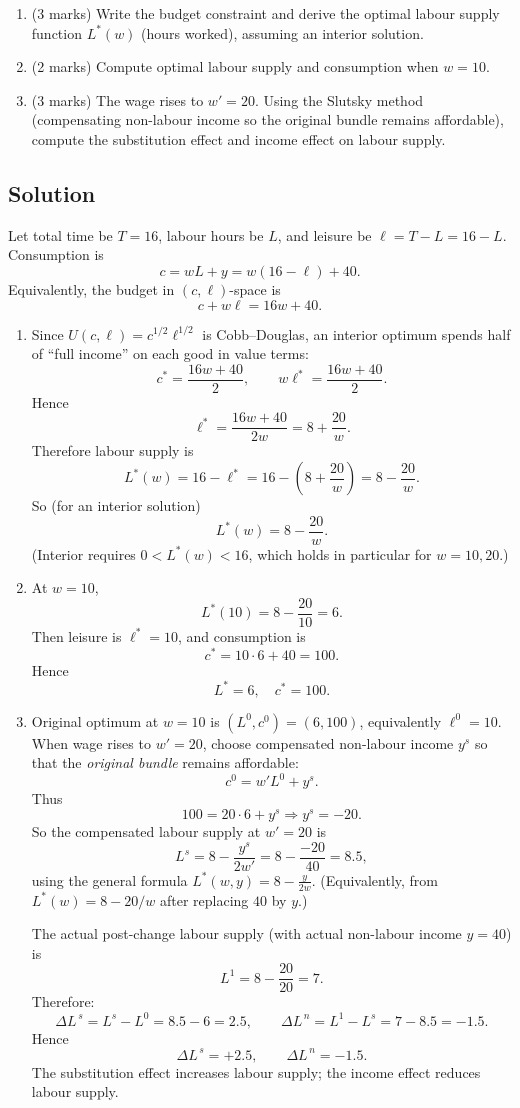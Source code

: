 \documentclass[12pt]{article}
\begin{document}
\begin{enumerate}[label=(\alph*)]
\item (3 marks) Write the budget constraint and derive the optimal labour supply function $L^*(w)$ (hours worked), assuming an interior solution.
\item (2 marks) Compute optimal labour supply and consumption when $w=10$.
\item (3 marks) The wage rises to $w'=20$. Using the Slutsky method (compensating non-labour income so the original bundle remains affordable), compute the substitution effect and income effect on labour supply.
\end{enumerate}

\subsection*{Solution}

Let total time be $T=16$, labour hours be $L$, and leisure be $\ell=T-L=16-L$.
Consumption is
\[
c=wL+y=w(16-\ell)+40.
\]
Equivalently, the budget in $(c,\ell)$-space is
\[
c+w\ell = 16w+40.
\]

\begin{enumerate}[label=(\alph*)]
\item Since $U(c,\ell)=c^{1/2}\ell^{1/2}$ is Cobb--Douglas, an interior optimum spends half of ``full income'' on each good in value terms:
\[
c^* = \frac{16w+40}{2},
\qquad
w\ell^* = \frac{16w+40}{2}.
\]
Hence
\[
\ell^* = \frac{16w+40}{2w}=8+\frac{20}{w}.
\]
Therefore labour supply is
\[
L^*(w)=16-\ell^*=16-\left(8+\frac{20}{w}\right)=8-\frac{20}{w}.
\]
So (for an interior solution) 
\[
\boxed{L^*(w)=8-\frac{20}{w}.}
\]
(Interior requires $0<L^*(w)<16$, which holds in particular for $w=10,20$.)

\item At $w=10$,
\[
L^*(10)=8-\frac{20}{10}=6.
\]
Then leisure is $\ell^*=10$, and consumption is
\[
c^*=10\cdot 6+40=100.
\]
Hence
\[
\boxed{L^*=6,\quad c^*=100.}
\]

\item Original optimum at $w=10$ is $(L^0,c^0)=(6,100)$, equivalently $\ell^0=10$.
When wage rises to $w'=20$, choose compensated non-labour income $y^s$ so that the \emph{original bundle} remains affordable:
\[
c^0 = w' L^0 + y^s.
\]
Thus
\[
100 = 20\cdot 6 + y^s \Rightarrow y^s=-20.
\]
So the compensated labour supply at $w'=20$ is
\[
L^s = 8 - \frac{y^s}{2w'} = 8 - \frac{-20}{40} = 8.5,
\]
using the general formula $L^*(w,y)=8-\frac{y}{2w}$.
(Equivalently, from $L^*(w)=8-20/w$ after replacing $40$ by $y$.)

The actual post-change labour supply (with actual non-labour income $y=40$) is
\[
L^1 = 8-\frac{20}{20}=7.
\]
Therefore:
\[
\Delta L^{\,s}=L^s-L^0 = 8.5-6 = 2.5,
\qquad
\Delta L^{\,n}=L^1-L^s = 7-8.5 = -1.5.
\]
Hence
\[
\boxed{\Delta L^{\,s}=+2.5,\qquad \Delta L^{\,n}=-1.5.}
\]
The substitution effect increases labour supply; the income effect reduces labour supply.
\end{enumerate}
\end{document}
